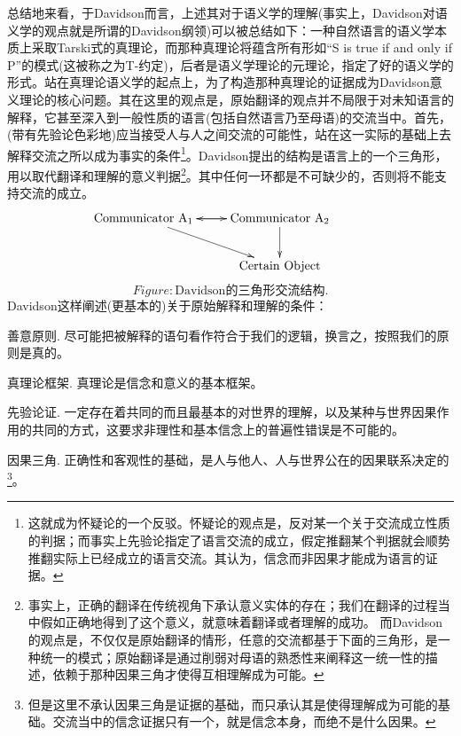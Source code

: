 \documentclass{article}
\begin{document}
总结地来看，于Davidson而言，上述其对于语义学的理解(事实上，Davidson对语义学的观点就是所谓的Davidson纲领)可以被总结如下：一种自然语言的语义学本质上采取Tarski式的真理论，而那种真理论将蕴含所有形如“S is true if and only if P”的模式(这被称之为T-约定)，后者是语义学理论的元理论，指定了好的语义学的形式。站在真理论语义学的起点上，为了构造那种真理论的证据成为Davidson意义理论的核心问题。其在这里的观点是，原始翻译的观点并不局限于对未知语言的解释，它甚至深入到一般性质的语言(包括自然语言乃至母语)的交流当中。首先，(带有先验论色彩地)应当接受人与人之间交流的可能性，站在这一实际的基础上去解释交流之所以成为事实的条件\footnote{这就成为怀疑论的一个反驳。怀疑论的观点是，反对某一个关于交流成立性质的判据；而事实上先验论指定了语言交流的成立，假定推翻某个判据就会顺势推翻实际上已经成立的语言交流。其认为，信念而非因果才能成为语言的证据。}。Davidson提出的结构是语言上的一个三角形，用以取代翻译和理解的意义判据\footnote{事实上，正确的翻译在传统视角下承认意义实体的存在；我们在翻译的过程当中假如正确地得到了这个意义，就意味着翻译或者理解的成功。
而Davidson的观点是，不仅仅是原始翻译的情形，任意的交流都基于下面的三角形，是一种统一的模式；原始翻译是通过削弱对母语的熟悉性来阐释这一统一性的描述，依赖于那种因果三角才使得互相理解成为可能。}。其中任何一环都是不可缺少的，否则将不能支持交流的成立。
$$\xymatrix{
\mathrm{Communicator\ A_1} \ar[r]\ar[dr] & \mathrm{Communicator\ A_2}\ar[l]\ar[d]  \\
 & \mathrm{Certain\ Object} &
}$$$$Figure:\text{Davidson的三角形交流结构.}$$
Davidson这样阐述(更基本的)关于原始解释和理解的条件：

{\heiti 善意原则.}
尽可能把被解释的语句看作符合于我们的逻辑，换言之，按照我们的原则是真的。

{\heiti 真理论框架.}
真理论是信念和意义的基本框架。

{\heiti 先验论证.}
一定存在着共同的而且最基本的对世界的理解，以及某种与世界因果作用的{\heiti 共同的方式}，这要求非理性和基本信念上的普遍性错误是不可能的。

{\heiti 因果三角.}
正确性和客观性的基础，是人与他人、人与世界公在的因果联系决定的\footnote{但是这里不承认因果三角是证据的基础，而只承认其是使得理解成为可能的基础。交流当中的信念证据只有一个，就是信念本身，而绝不是什么因果。}。
\end{document}
